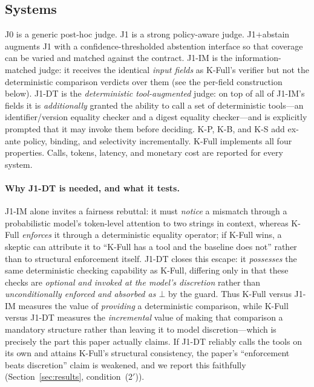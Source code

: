 \documentclass[sigconf,anonymous,review]{acmart}
\begin{document}
\subsection{Systems}
J0 is a generic post-hoc judge. J1 is a strong policy-aware judge. J1$+$abstain augments J1 with a confidence-thresholded abstention interface so that coverage can be varied and matched against the contract. J1-IM is the information-matched judge: it receives the identical \emph{input fields} as K-Full's verifier but not the deterministic comparison verdicts over them (see the per-field construction below). J1-DT is the \emph{deterministic tool-augmented} judge: on top of all of J1-IM's fields it is \emph{additionally} granted the ability to call a set of deterministic tools---an identifier/version equality checker and a digest equality checker---and is explicitly prompted that it may invoke them before deciding. K-P, K-B, and K-S add ex-ante policy, binding, and selectivity incrementally. K-Full implements all four properties. Calls, tokens, latency, and monetary cost are reported for every system.

\paragraph{Why J1-DT is needed, and what it tests.} J1-IM alone invites a fairness rebuttal: it must \emph{notice} a mismatch through a probabilistic model's token-level attention to two strings in context, whereas K-Full \emph{enforces} it through a deterministic equality operator; if K-Full wins, a skeptic can attribute it to ``K-Full has a tool and the baseline does not'' rather than to structural enforcement itself. J1-DT closes this escape: it \emph{possesses} the same deterministic checking capability as K-Full, differing only in that these checks are \emph{optional and invoked at the model's discretion} rather than \emph{unconditionally enforced and absorbed as $\bot$} by the guard. Thus K-Full versus J1-IM measures the value of \emph{providing} a deterministic comparison, while K-Full versus J1-DT measures the \emph{incremental} value of making that comparison a mandatory structure rather than leaving it to model discretion---which is precisely the part this paper actually claims. If J1-DT reliably calls the tools on its own and attains K-Full's structural consistency, the paper's ``enforcement beats discretion'' claim is weakened, and we report this faithfully (Section~\ref{sec:results}, condition~(2$'$)).
\end{document}
